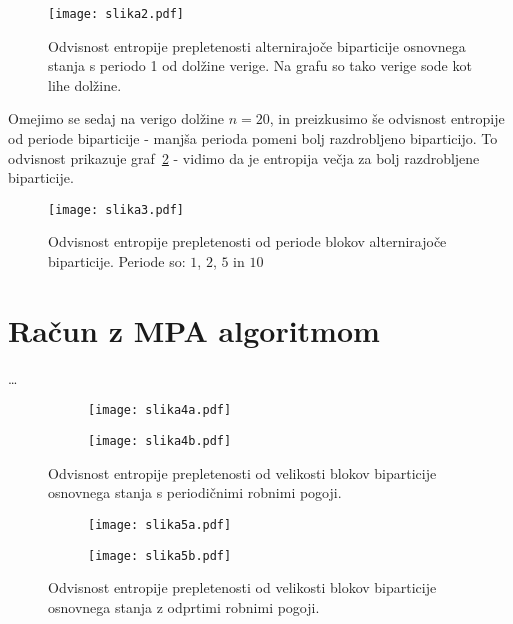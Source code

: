 \documentclass[a4paper]{article}
\begin{document}
    \begin{figure}
        \centering
        \texttt{[image: slika2.pdf]}
        \caption{Odvisnost entropije prepletenosti alternirajoče biparticije osnovnega stanja s periodo 1 od dolžine verige. Na grafu so tako
        verige sode kot lihe dolžine.}
        \label{slika2}
    \end{figure}

    Omejimo se sedaj na verigo dolžine $n = 20$, in preizkusimo še odvisnost entropije od periode biparticije - manjša perioda pomeni bolj
    razdrobljeno biparticijo. To odvisnost prikazuje graf~\ref{slika3} - vidimo da je entropija večja za bolj razdrobljene biparticije.

    \begin{figure}
        \centering
        \texttt{[image: slika3.pdf]}
        \caption{Odvisnost entropije prepletenosti od periode blokov alternirajoče biparticije. Periode so: $1$, $2$, $5$ in $10$}
        \label{slika3}
    \end{figure}

    \section{Račun z MPA algoritmom}

    \ldots

    \begin{figure}
        \centering
        \begin{subfigure}{\textwidth}
            \texttt{[image: slika4a.pdf]}
        \end{subfigure}
        \begin{subfigure}{\textwidth}
            \texttt{[image: slika4b.pdf]}
        \end{subfigure}
        \caption{Odvisnost entropije prepletenosti od velikosti blokov biparticije osnovnega stanja s periodičnimi robnimi pogoji.}
        \label{slika4}
    \end{figure}

    \begin{figure}
        \centering
        \begin{subfigure}{\textwidth}
            \texttt{[image: slika5a.pdf]}
        \end{subfigure}
        \begin{subfigure}{\textwidth}
            \texttt{[image: slika5b.pdf]}
        \end{subfigure}
        \caption{Odvisnost entropije prepletenosti od velikosti blokov biparticije osnovnega stanja z odprtimi robnimi pogoji.}
        \label{slika5}
    \end{figure}
\end{document}
